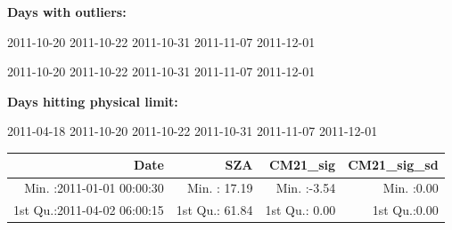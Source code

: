 \documentclass[
  10pt,
  a4paper,oneside]{article}
\begin{document}
\normalsize

\textbf{Days with outliers:}

2011-10-20 2011-10-22 2011-10-31 2011-11-07 2011-12-01

2011-10-20 2011-10-22 2011-10-31 2011-11-07 2011-12-01

\textbf{Days hitting physical limit:}

2011-04-18 2011-10-20 2011-10-22 2011-10-31 2011-11-07 2011-12-01

\footnotesize

\begin{longtable}[]{@{}rrrr@{}}
\toprule
\begin{minipage}[b]{0.34\columnwidth}\raggedleft
Date\strut
\end{minipage} & \begin{minipage}[b]{0.19\columnwidth}\raggedleft
SZA\strut
\end{minipage} & \begin{minipage}[b]{0.18\columnwidth}\raggedleft
CM21\_sig\strut
\end{minipage} & \begin{minipage}[b]{0.18\columnwidth}\raggedleft
CM21\_sig\_sd\strut
\end{minipage}\tabularnewline
\midrule
\endhead
\begin{minipage}[t]{0.34\columnwidth}\raggedleft
Min. :2011-01-01 00:00:30\strut
\end{minipage} & \begin{minipage}[t]{0.19\columnwidth}\raggedleft
Min. : 17.19\strut
\end{minipage} & \begin{minipage}[t]{0.18\columnwidth}\raggedleft
Min. :-3.54\strut
\end{minipage} & \begin{minipage}[t]{0.18\columnwidth}\raggedleft
Min. :0.00\strut
\end{minipage}\tabularnewline
\begin{minipage}[t]{0.34\columnwidth}\raggedleft
1st Qu.:2011-04-02 06:00:15\strut
\end{minipage} & \begin{minipage}[t]{0.19\columnwidth}\raggedleft
1st Qu.: 61.84\strut
\end{minipage} & \begin{minipage}[t]{0.18\columnwidth}\raggedleft
1st Qu.: 0.00\strut
\end{minipage} & \begin{minipage}[t]{0.18\columnwidth}\raggedleft
1st Qu.:0.00\strut

\end{minipage}
\end{longtable}
\end{document}
